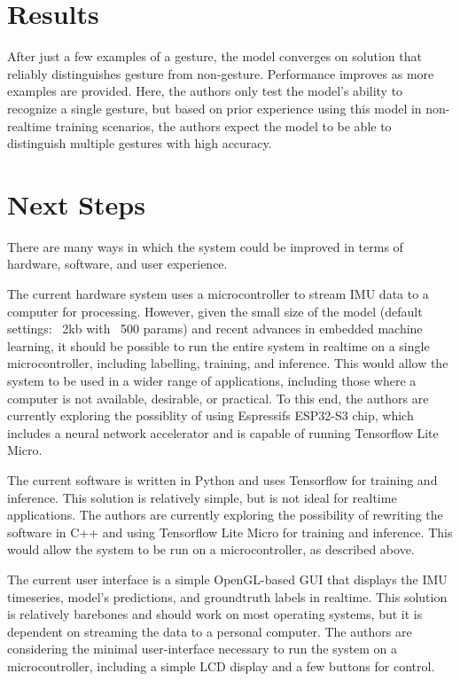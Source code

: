 \documentclass{article}
\begin{document}
\section{Results}
After just a few examples of a gesture, the model converges on solution that reliably distinguishes gesture from non-gesture. Performance improves as more examples are provided. Here, the authors only test the model's ability to recognize a single gesture, but based on prior experience using this model in non-realtime training scenarios, the authors expect the model to be able to distinguish multiple gestures with high accuracy.

\section{Next Steps}
There are many ways in which the system could be improved in terms of hardware, software, and user experience.

The current hardware system uses a microcontroller to stream IMU data to a computer for processing. However, given the small size of the model (default settings: ~2kb with ~500 params) and recent advances in embedded machine learning, it should be possible to run the entire system in realtime on a single microcontroller, including labelling, training, and inference. This would allow the system to be used in a wider range of applications, including those where a computer is not available, desirable, or practical. To this end, the authors are currently exploring the possiblity of using Espressifs ESP32-S3 chip, which includes a neural network accelerator and is capable of running Tensorflow Lite Micro.

The current software is written in Python and uses Tensorflow for training and inference. This solution is relatively simple, but is not ideal for realtime applications. The authors are currently exploring the possibility of rewriting the software in C++ and using Tensorflow Lite Micro for training and inference. This would allow the system to be run on a microcontroller, as described above.

The current user interface is a simple OpenGL-based GUI that displays the IMU timeseries, model's predictions, and groundtruth labels in realtime. This solution is relatively barebones and should work on most operating systems, but it is dependent on streaming the data to a personal computer. The authors are considering the minimal user-interface necessary to run the system on a microcontroller, including a simple LCD display and a few buttons for control.
\end{document}

